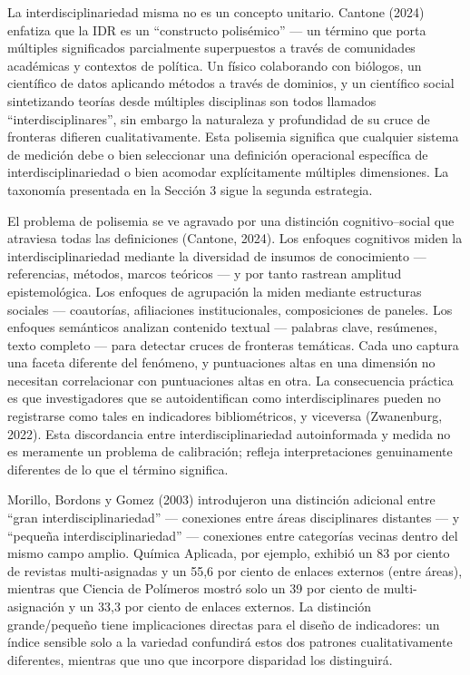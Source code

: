 \documentclass[
]{article}
\begin{document}
La interdisciplinariedad misma no es un concepto unitario. Cantone
(2024) enfatiza que la IDR es un ``constructo polisémico'' --- un
término que porta múltiples significados parcialmente superpuestos a
través de comunidades académicas y contextos de política. Un físico
colaborando con biólogos, un científico de datos aplicando métodos a
través de dominios, y un científico social sintetizando teorías desde
múltiples disciplinas son todos llamados ``interdisciplinares'', sin
embargo la naturaleza y profundidad de su cruce de fronteras difieren
cualitativamente. Esta polisemia significa que cualquier sistema de
medición debe o bien seleccionar una definición operacional específica
de interdisciplinariedad o bien acomodar explícitamente múltiples
dimensiones. La taxonomía presentada en la Sección 3 sigue la segunda
estrategia.

El problema de polisemia se ve agravado por una distinción
cognitivo--social que atraviesa todas las definiciones (Cantone, 2024).
Los enfoques cognitivos miden la interdisciplinariedad mediante la
diversidad de insumos de conocimiento --- referencias, métodos, marcos
teóricos --- y por tanto rastrean amplitud epistemológica. Los enfoques
de agrupación la miden mediante estructuras sociales --- coautorías,
afiliaciones institucionales, composiciones de paneles. Los enfoques
semánticos analizan contenido textual --- palabras clave, resúmenes,
texto completo --- para detectar cruces de fronteras temáticas. Cada uno
captura una faceta diferente del fenómeno, y puntuaciones altas en una
dimensión no necesitan correlacionar con puntuaciones altas en otra. La
consecuencia práctica es que investigadores que se autoidentifican como
interdisciplinares pueden no registrarse como tales en indicadores
bibliométricos, y viceversa (Zwanenburg, 2022). Esta discordancia entre
interdisciplinariedad autoinformada y medida no es meramente un problema
de calibración; refleja interpretaciones genuinamente diferentes de lo
que el término significa.

Morillo, Bordons y Gomez (2003) introdujeron una distinción adicional
entre ``gran interdisciplinariedad'' --- conexiones entre áreas
disciplinares distantes --- y ``pequeña interdisciplinariedad'' ---
conexiones entre categorías vecinas dentro del mismo campo amplio.
Química Aplicada, por ejemplo, exhibió un 83 por ciento de revistas
multi-asignadas y un 55,6 por ciento de enlaces externos (entre áreas),
mientras que Ciencia de Polímeros mostró solo un 39 por ciento de
multi-asignación y un 33,3 por ciento de enlaces externos. La distinción
grande/pequeño tiene implicaciones directas para el diseño de
indicadores: un índice sensible solo a la variedad confundirá estos dos
patrones cualitativamente diferentes, mientras que uno que incorpore
disparidad los distinguirá.
\end{document}
